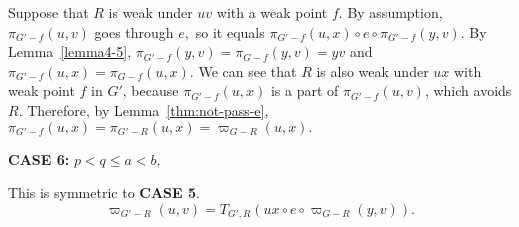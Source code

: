 \documentclass[11pt]{article}
\theoremstyle{plain}
\theoremstyle{definition}
\newcommand{\og}[3]{\pi_{G-#3}\left(#1,#2\right)}
\newcommand{\nng}[3]{\pi_{G'-#3}\left(#1,#2\right)}
\newcommand{\odg}[3]{\varpi_{G-#3}\left(#1,#2\right)}
\newcommand{\ndg}[3]{\varpi_{G'-#3}\left(#1,#2\right)}
\newcommand{\pp}[1]{T_{G',R}\left(#1\right)}
\begin{document}
Suppose that $R$ is weak under $uv$ with a weak point $f.$ By assumption, $\nng{u}{v}{f}$ goes through $e,$ so it equals $\nng{u}{x}{f}\circ e\circ\nng{y}{v}{f}.$ By Lemma~\ref{lemma4-5}, $\nng{y}{v}{f}=\og{y}{v}{f}=yv$ and $\nng{u}{x}{f}=\og{u}{x}{f}$. We can see that $R$ is also weak under $ux$ with weak point $f$ in $G'$, because $\nng{u}{x}{f}$ is a part of $\nng{u}{v}{f}$, which avoids $R.$ Therefore, by Lemma~\ref{thm:not-pass-e}, $\nng{u}{x}{f}=\nng{u}{x}{R}=\odg{u}{x}{R}.$


\vspace{5pt}
\noindent\textbf{CASE 6:} $p<q\le a<b$,

This is symmetric to \textbf{CASE 5}.
$$\ndg{u}{v}{R}=\pp{ux\circ e\circ\odg{y}{v}{R}}.$$


\iffalse
{} 
\end{document}
